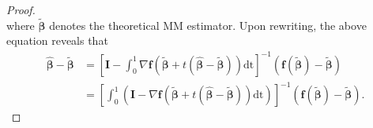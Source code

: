 \documentclass[11pt]{article}
\begin{document}
\begin{proof}
\begin{equation}
\end{equation}
where $\boldsymbol{\widetilde{\beta}}$ denotes the theoretical MM estimator. Upon rewriting, the above equation reveals that
\begin{align}
\boldsymbol{\widehat{\beta}}  - \boldsymbol{\widetilde{\beta}}   & = \left[ \mathbf{I} - \int_{0}^1  \nabla \mathbf{f} \left (\boldsymbol{\widetilde{\beta}} + t \left( \boldsymbol{\widehat{\beta}}-\boldsymbol{\widetilde{\beta}} \right) \right) \mathrm{dt} \right]^{-1} ( \mathbf{f} ( \boldsymbol{\widetilde{\beta}}) -\boldsymbol{ \widetilde{\beta} } ) \nonumber
\\ & = \left[ \int_{0}^{1} \left(\mathbf{I} -  \nabla \mathbf{f} \left (\boldsymbol{\widetilde{\beta}} + t \left( \boldsymbol{\widehat{\beta}}-\boldsymbol{\widetilde{\beta}} \right) \right) \mathrm{dt} \right) \right]^{-1} ( \mathbf{f} ( \boldsymbol{\widetilde{\beta}}) -\boldsymbol{ \widetilde{\beta} } ).
\end{align}


\end{proof}
\end{document}
